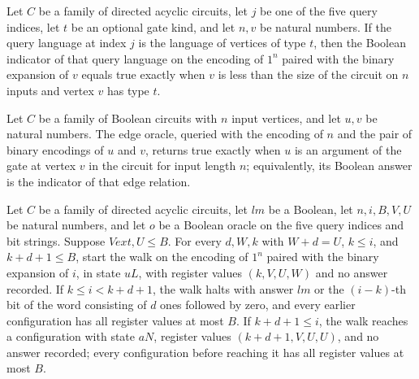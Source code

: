 \begin{lemma}
\label{BoolCircuit.AdjWalk.orc_type}
\leanok
{}
Let $C$ be a family of directed acyclic circuits, let $j$ be one of the five query
indices, let $t$ be an optional gate kind, and let $n,v$ be natural numbers. If the
query language at index $j$ is the language of vertices of type $t$, then the Boolean
indicator of that query language on the encoding of $1^n$ paired with the binary
expansion of $v$ equals true exactly when $v$ is less than the size of the circuit on
$n$ inputs and vertex $v$ has type $t$.
\end{lemma}

\begin{lemma}
\label{BoolCircuit.AdjWalk.orc_edge}
\leanok
{}
Let $C$ be a family of Boolean circuits with $n$ input vertices, and let $u,v$ be
natural numbers. The edge oracle, queried with the encoding of $n$ and the pair of
binary encodings of $u$ and $v$, returns true exactly when $u$ is an argument of the
gate at vertex $v$ in the circuit for input length $n$; equivalently, its Boolean answer
is the indicator of that edge relation.
\end{lemma}

\begin{lemma}
\label{BoolCircuit.AdjWalk.uLoop}
\leanok
{}
Let $C$ be a family of directed acyclic circuits, let $lm$ be a Boolean, let $n,i,B,V,U$
be natural numbers, and let $o$ be a Boolean oracle on the five query indices and bit
strings. Suppose $V	ext{,}U\le B$. For every $d,W,k$ with $W+d=U$, $k\le i$, and
$k+d+1\le B$, start the walk on the encoding of $1^n$ paired with the binary expansion
of $i$, in state $uL$, with register values $(k,V,U,W)$ and no answer recorded. If $k\le
i<k+d+1$, the walk halts with answer $lm$ or the $(i-k)$-th bit of the word consisting
of $d$ ones followed by zero, and every earlier configuration has all register values at
most $B$. If $k+d+1\le i$, the walk reaches a configuration with state $aN$, register
values $(k+d+1,V,U,U)$, and no answer recorded; every configuration before reaching it
has all register values at most $B$.
\end{lemma}

